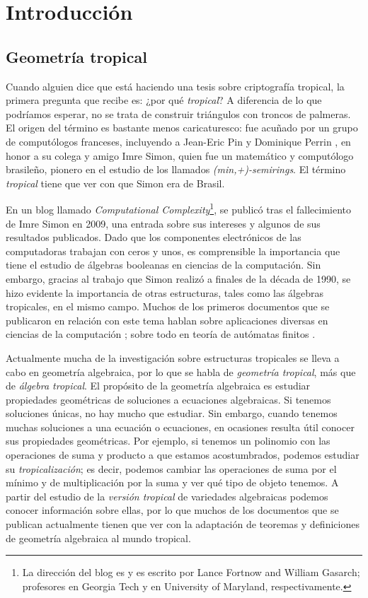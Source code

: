 \chapter{Introducción}
\section{Geometría tropical}
\noindent Cuando alguien dice que está haciendo una tesis sobre criptografía tropical, la primera pregunta que recibe es: ¿por qué \textit{tropical}? A diferencia de lo que podríamos esperar, no se trata de construir triángulos con troncos de palmeras. El origen del término es bastante menos caricaturesco: fue acuñado por un grupo de computólogos franceses, incluyendo a Jean-Eric Pin \cite{pin} y Dominique Perrin \cite{perr}, en honor a su colega y amigo Imre Simon, quien fue un matemático y computólogo brasileño, pionero en el estudio de los llamados \textit{(min,+)-semirings}. El término \textit{tropical} tiene que ver con que Simon era de Brasil.

\bigskip En un blog llamado \textit{Computational Complexity}\footnote{La dirección del blog es  y es escrito por Lance Fortnow and William Gasarch; profesores en Georgia Tech y en University of Maryland, respectivamente.}, se publicó tras el fallecimiento de Imre Simon en 2009, una entrada sobre sus intereses y algunos de sus resultados publicados. Dado que los componentes electrónicos de las computadoras trabajan con ceros y unos, es comprensible la importancia que tiene el estudio de álgebras booleanas en ciencias de la computación. Sin embargo, gracias al trabajo que Simon realizó a finales de la década de 1990, se hizo evidente la importancia de otras estructuras, tales como las álgebras tropicales, en el mismo campo. Muchos de los primeros documentos que se publicaron en relación con este tema hablan sobre aplicaciones diversas en ciencias de la computación \cite{pin}; sobre todo en teoría de autómatas finitos \cite{automat}.

\bigskip Actualmente mucha de la investigación sobre estructuras tropicales se lleva a cabo en geometría algebraica, por lo que se habla de \textit{geometría tropical}, más que de \textit{álgebra tropical}. El propósito de la geometría algebraica es estudiar propiedades geométricas de soluciones a ecuaciones algebraicas. Si tenemos soluciones únicas, no hay mucho que estudiar. Sin embargo, cuando tenemos muchas soluciones a una ecuación o ecuaciones, en ocasiones resulta útil conocer sus propiedades geométricas. Por ejemplo, si tenemos un polinomio con las operaciones de suma y producto a que estamos acostumbrados, podemos estudiar su \textit{tropicalización}; es decir, podemos cambiar las operaciones de suma por el mínimo y de multiplicación por la suma y ver qué tipo de objeto tenemos. A partir del estudio de la \textit{versión tropical} de variedades algebraicas podemos conocer información sobre ellas, por lo que muchos de los documentos que se publican actualmente tienen que ver con la adaptación de teoremas y definiciones de geometría algebraica al mundo tropical.

